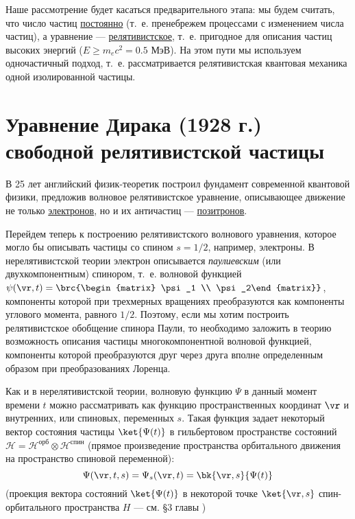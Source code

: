 Наше рассмотрение будет касаться предварительного этапа: мы будем считать, что число частиц \underline{постоянно} (т.~е. пренебрежем процессами с изменением числа частиц), а уравнение --- \underline{релятивистское}, т.~е. пригодное для описания частиц высоких энергий (${E \ge m_e c^2 = 0.5}$ МэВ). На этом пути мы используем одночастичный подход, т.~е. рассматривается релятивистская квантовая механика одной изолированной частицы.

\section{Уравнение Дирака (1928 г.) свободной релятивистской частицы}

В 25 лет английский физик-теоретик построил фундамент современной квантовой физики, предложив волновое релятивистское уравнение, описывающее движение не только \underline{электронов}, но и их античастиц --- \underline{позитронов}.

Перейдем теперь к построению релятивистского волнового уравнения, которое могло бы описывать частицы со спином $s = 1/2$, например, электроны. В нерелятивистской теории электрон описывается {\em паулиевским} (или двухкомпонентным) спинором, т.~е. волновой функцией $\psi(\vr, t) = \brc{\begin{matrix} \psi_1 \\ \psi_2\end{matrix}}$, компоненты которой при трехмерных вращениях преобразуются как компоненты углового момента, равного $1/2$. Поэтому, если мы хотим построить релятивистское обобщение спинора Паули, то необходимо заложить в теорию возможность описания частицы многокомпонентной волновой функцией, компоненты которой преобразуются друг через друга вполне определенным образом при преобразованиях Лоренца.

Как и в нерелятивистской теории, волновую функцию $\Psi$ в данный момент времени $t$ можно рассматривать как функцию пространственных координат $\vr$ и внутренних, или спиновых, переменных $s$. Такая функция задает некоторый вектор состояния частицы $\ket{\Psi(t)}$ в гильбертовом пространстве состояний $\mathcal{H} = \mathcal{H}^{\text{орб}} \otimes \mathcal{H}^{\text{спин}}$ (прямое произведение пространства орбитального движения на пространство спиновой переменной):
$$
\Psi(\vr, t, s) = \Psi_s(\vr, t) = \bk{\vr, s}{\Psi(t)}
$$
(проекция вектора состояний $\ket{\Psi(t)}$ в некоторой точке $\ket{\vr, s}$ спин-орбитального пространства $H$ --- см. \S 3 главы )

